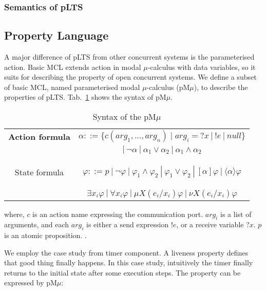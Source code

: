 \documentclass[runningheads,a4paper]{llncs}
\begin{document}
\subsubsection{Semantics of pLTS}





\subsection{Property Language}

A major difference of pLTS from other concurrent systems is the parameterised action. Basic MCL\cite{radu2008mcl} extends action in modal $\mu$-calculus with data variables, so it suits for describing the property of open concurrent systems. We define a subset of basic MCL, named parameterised modal $\mu$-calculus (pM$\mu$), to describe the properties of pLTS. Tab.~\ref{mcl} shows the syntax of pM$\mu$.

\begin{table}
	\setlength\tabcolsep{18pt}%
	\centering 
	\caption{Syntax of the pM$\mu$} 
	\label{mcl}
	\begin{tabular}{>{\bfseries}c| c } 
		\hline 		
	Action formula 	&     $\alpha ::= \{c(arg_{1}, ..., arg_{n})\mid arg_{i}=?x\ |\ !e\ |\ null \}$                  \\
	& $|\ \neg\alpha \ |\ \alpha_{1}\vee\alpha_{2}\ |\ \alpha_{1}\wedge\alpha_{2}$   \\ 	\hline 
		
	State formula 	&  $\varphi ::= p \ |\ \neg\varphi \ |\ \varphi_{1}\wedge\varphi_{2}\ |\ \varphi_{1}\vee\varphi_{2} \ |\ [\alpha]\varphi \ |\ \langle\alpha\rangle\varphi$ \\ 
	& $\exists x_{i}\varphi\ |\ \forall x_{i}\varphi\ |\ \mu X(e_{i}/x_{i})\varphi\ |\ \nu X(e_{i}/x_{i})\varphi$	\\ \hline 
	\end{tabular} 
	
\end{table} 
 
 where, $c$ is an action name expressing the communication port. $arg_{i}$ is a list of arguments, and each $arg_{i}$ is either a send expression $!e$, or a receive variable $?x$. $p$ is an atomic proposition.  
  {\color{red}{[To do Tengfei: Must complete the explaination ]}}.


We employ the case study from timer component\cite{mavridou2016architectrue}. A liveness property defines that good thing finally happens. In this case study, intuitively the timer finally returns to the initial state after some execution steps. The property can be expressed by pM$\mu$:
\end{document}
